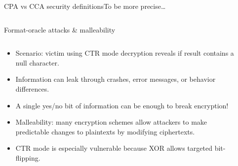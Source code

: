 \documentclass[aspectratio=169, lualatex, handout]{beamer}
\begin{document}
\begin{frame}{CPA vs CCA security definitions}{To be more precise\ldots}
	\begin{columns}[c]
		\begin{column}{0.5\textwidth}
		\end{column}
		\begin{column}{0.5\textwidth}
		\end{column}
	\end{columns}
\end{frame}

\begin{frame}{Format-oracle attacks \& malleability}
	\begin{columns}[c]
		\begin{column}{0.6\textwidth}
			\begin{itemize}
				\item Scenario: victim using CTR mode decryption reveals if result contains a null character.
				\item Information can leak through crashes, error messages, or behavior differences.
				\item A single yes/no bit of information can be enough to break encryption!
				\item Malleability: many encryption schemes allow attackers to make predictable changes to plaintexts by modifying ciphertexts.
				\item CTR mode is especially vulnerable because XOR allows targeted bit-flipping.
			\end{itemize}
		\end{column}
		\begin{column}{0.4\textwidth}
		\end{column}
	\end{columns}
\end{frame}
\end{document}

